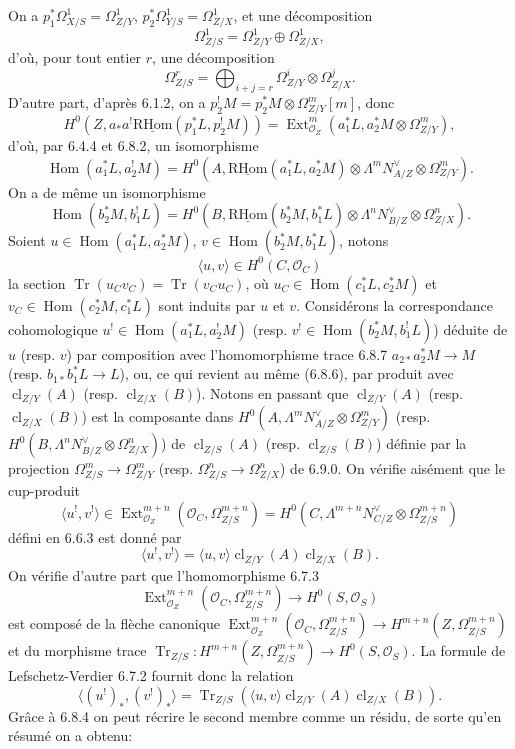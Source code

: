 \documentclass[11pt]{article}
\DeclareMathOperator{\Hom}{Hom}
\DeclareMathOperator{\Ext}{Ext}
\newcommand{\R}{\mathrm{R}}\newcommand{\RHomCore}{\mathrm{RHom}}
\providecommand{\RHom}{\RHomCore}
\providecommand{\uRHom}{\underline{\RHom}}
\providecommand{\cl}{\operatorname{cl}}
\providecommand{\OO}{\mathcal{O}}
\providecommand{\RHom}{\RHomCore}
\providecommand{\Hom}{\operatorname{Hom}}
\providecommand{\RHom}{\R\mathcal{H}om}
\providecommand{\R}{\mathrm R}
\providecommand{\cl}{\operatorname{cl}}
\providecommand{\RHom}{\RHomCore}
\providecommand{\Hom}{\operatorname{Hom}}
\providecommand{\cl}{\operatorname{cl}}
\begin{document}
On a $p_1^*\Omega^1_{X/S}=\Omega^1_{Z/Y}$, $p_2^*\Omega^1_{Y/S}=\Omega^1_{Z/X}$, et une décomposition
\[
\Omega^1_{Z/S}=\Omega^1_{Z/Y}\oplus\Omega^1_{Z/X},
\]
d'où, pour tout entier $r$, une décomposition
\begin{equation}
\tag{6.9.0}
\Omega^r_{Z/S}=\bigoplus_{i+j=r}\Omega^i_{Z/Y}\otimes\Omega^j_{Z/X}.
\end{equation}
D'autre part, d'après 6.1.2, on a $p_2^!M=p_2^*M\otimes\Omega^m_{Z/Y}[m]$, donc
\[
H^0(Z,a_*a^!\uRHom(p_1^*L,p_2^!M))=\Ext^m_{\OO_Z}(a_1^*L,a_2^*M\otimes\Omega^m_{Z/Y}),
\]
d'où, par 6.4.4 et 6.8.2, un isomorphisme
\begin{equation}
\tag{6.9.1}
\Hom(a_1^*L,a_2^!M)=H^0(A,\uRHom(a_1^*L,a_2^*M)\otimes\Lambda^m N_{A/Z}^{\vee}\otimes\Omega^m_{Z/Y}).
\end{equation}
On a de même un isomorphisme
\begin{equation}
\tag{6.9.2}
\Hom(b_2^*M,b_1^!L)=H^0(B,\uRHom(b_2^*M,b_1^*L)\otimes\Lambda^n N_{B/Z}^{\vee}\otimes\Omega^n_{Z/X}).
\end{equation}
Soient $u\in\Hom(a_1^*L,a_2^*M)$, $v\in\Hom(b_2^*M,b_1^*L)$, notons
\begin{equation}
\tag{6.9.3}
\langle u,v\rangle\in H^0(C,\OO_C)
\end{equation}
la section $\operatorname{Tr}(u_Cv_C)=\operatorname{Tr}(v_Cu_C)$, où $u_C\in\Hom(c_1^*L,c_2^*M)$ et $v_C\in\Hom(c_2^*M,c_1^*L)$ sont induits par $u$ et $v$. Considérons la correspondance cohomologique $u^!\in\Hom(a_1^*L,a_2^!M)$ (resp. $v^!\in\Hom(b_2^*M,b_1^!L)$) déduite de $u$ (resp. $v$) par composition avec l'homomorphisme trace 6.8.7 $a_{2*}a_2^*M\to M$ (resp. $b_{1*}b_1^*L\to L$), ou, ce qui revient au même (6.8.6), par produit avec $\cl_{Z/Y}(A)$ (resp. $\cl_{Z/X}(B)$). Notons en passant que $\cl_{Z/Y}(A)$ (resp. $\cl_{Z/X}(B)$) est la composante dans $H^0(A,\Lambda^mN_{A/Z}^{\vee}\otimes\Omega^m_{Z/Y})$ (resp. $H^0(B,\Lambda^nN_{B/Z}^{\vee}\otimes\Omega^n_{Z/X})$) de $\cl_{Z/S}(A)$ (resp. $\cl_{Z/S}(B)$) définie par la projection $\Omega^m_{Z/S}\to\Omega^m_{Z/Y}$ (resp. $\Omega^n_{Z/S}\to\Omega^n_{Z/X}$) de 6.9.0. On vérifie aisément que le cup-produit
\[
\langle u^!,v^!\rangle\in\Ext^{m+n}_{\OO_Z}(\OO_C,\Omega^{m+n}_{Z/S})=H^0(C,\Lambda^{m+n}N_{C/Z}^{\vee}\otimes\Omega^{m+n}_{Z/S})
\]
défini en 6.6.3 est donné par
\begin{equation}
\tag{6.9.4}
\langle u^!,v^!\rangle=\langle u,v\rangle\cl_{Z/Y}(A)\cl_{Z/X}(B).
\end{equation}
On vérifie d'autre part que l'homomorphisme 6.7.3
\[
\Ext^{m+n}_{\OO_Z}(\OO_C,\Omega^{m+n}_{Z/S})\longrightarrow H^0(S,\OO_S)
\]
est composé de la flèche canonique $\Ext^{m+n}_{\OO_Z}(\OO_C,\Omega^{m+n}_{Z/S})\to H^{m+n}(Z,\Omega^{m+n}_{Z/S})$ et du morphisme trace $\operatorname{Tr}_{Z/S}:H^{m+n}(Z,\Omega^{m+n}_{Z/S})\to H^0(S,\OO_S)$. La formule de Lefschetz-Verdier 6.7.2 fournit donc la relation
\begin{equation}
\tag{6.9.5}
\langle (u^!)_*,(v^!)_*\rangle=\operatorname{Tr}_{Z/S}(\langle u,v\rangle\cl_{Z/Y}(A)\cl_{Z/X}(B)).
\end{equation}
Grâce à 6.8.4 on peut récrire le second membre comme un résidu, de sorte qu'en résumé on a obtenu:
\end{document}
